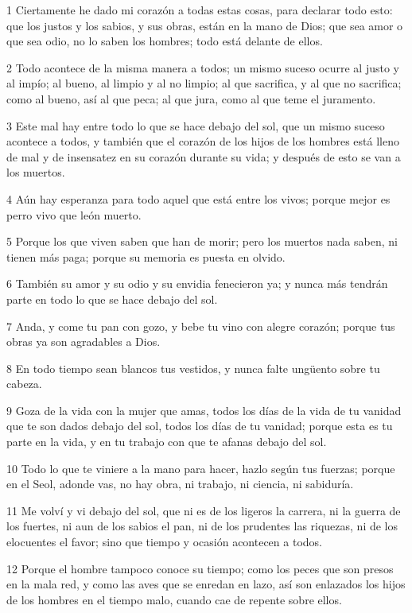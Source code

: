 \par 1 Ciertamente he dado mi corazón a todas estas cosas, para declarar todo esto: que los justos y los sabios, y sus obras, están en la mano de Dios; que sea amor o que sea odio, no lo saben los hombres; todo está delante de ellos.
\par 2 Todo acontece de la misma manera a todos; un mismo suceso ocurre al justo y al impío; al bueno, al limpio y al no limpio; al que sacrifica, y al que no sacrifica; como al bueno, así al que peca; al que jura, como al que teme el juramento.
\par 3 Este mal hay entre todo lo que se hace debajo del sol, que un mismo suceso acontece a todos, y también que el corazón de los hijos de los hombres está lleno de mal y de insensatez en su corazón durante su vida; y después de esto se van a los muertos.
\par 4 Aún hay esperanza para todo aquel que está entre los vivos; porque mejor es perro vivo que león muerto.
\par 5 Porque los que viven saben que han de morir; pero los muertos nada saben, ni tienen más paga; porque su memoria es puesta en olvido.
\par 6 También su amor y su odio y su envidia fenecieron ya; y nunca más tendrán parte en todo lo que se hace debajo del sol.
\par 7 Anda, y come tu pan con gozo, y bebe tu vino con alegre corazón; porque tus obras ya son agradables a Dios.
\par 8 En todo tiempo sean blancos tus vestidos, y nunca falte ungüento sobre tu cabeza.
\par 9 Goza de la vida con la mujer que amas, todos los días de la vida de tu vanidad que te son dados debajo del sol, todos los días de tu vanidad; porque esta es tu parte en la vida, y en tu trabajo con que te afanas debajo del sol.
\par 10 Todo lo que te viniere a la mano para hacer, hazlo según tus fuerzas; porque en el Seol, adonde vas, no hay obra, ni trabajo, ni ciencia, ni sabiduría.
\par 11 Me volví y vi debajo del sol, que ni es de los ligeros la carrera, ni la guerra de los fuertes, ni aun de los sabios el pan, ni de los prudentes las riquezas, ni de los elocuentes el favor; sino que tiempo y ocasión acontecen a todos.
\par 12 Porque el hombre tampoco conoce su tiempo; como los peces que son presos en la mala red, y como las aves que se enredan en lazo, así son enlazados los hijos de los hombres en el tiempo malo, cuando cae de repente sobre ellos.
